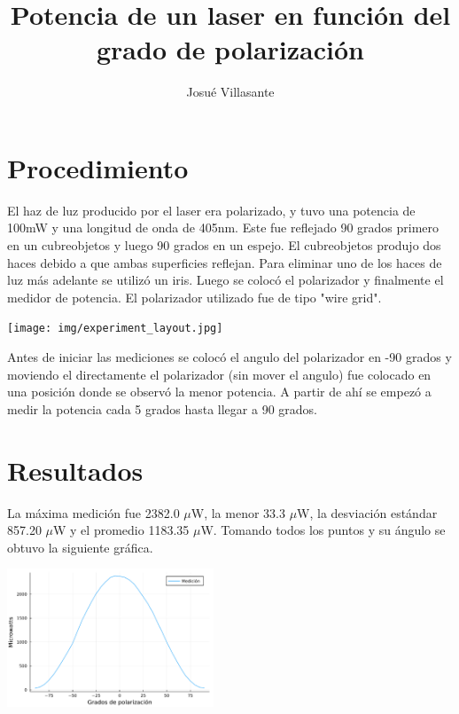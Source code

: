 \documentclass[twocolumn]{article}
\author{Josué Villasante}
\title{Potencia de un laser en función del grado de polarización}
\begin{document}
	\maketitle

	\section{Procedimiento}

		El haz de luz producido por el laser era polarizado, y tuvo una potencia de 100mW y una longitud de onda de 405nm. Este fue reflejado 90 grados primero en un cubreobjetos y luego 90 grados en un espejo. El cubreobjetos produjo dos haces debido a que ambas superficies reflejan. Para eliminar uno de los haces de luz más adelante se utilizó un iris. Luego se colocó el polarizador y finalmente el medidor de potencia. El polarizador utilizado fue de tipo "wire grid".

		\begin{center}
			\texttt{[image: img/experiment\_layout.jpg]}
		\end{center}

		Antes de iniciar las mediciones se colocó el angulo del polarizador en -90 grados y moviendo el directamente el polarizador (sin mover el angulo) fue colocado en una posición donde se observó la menor potencia. A partir de ahí se empezó a medir la potencia cada 5 grados hasta llegar a 90 grados.

	\section{Resultados}

		La máxima medición fue 2382.0 $\mu$W, la menor 33.3 $\mu$W, la desviación estándar 857.20 $\mu$W y el promedio 1183.35 $\mu$W. Tomando todos los puntos y su ángulo se obtuvo la siguiente gráfica.

		\begin{center}
			\includegraphics[width=175pt]{img/plot_raw.pdf}
		\end{center}
\end{document}
